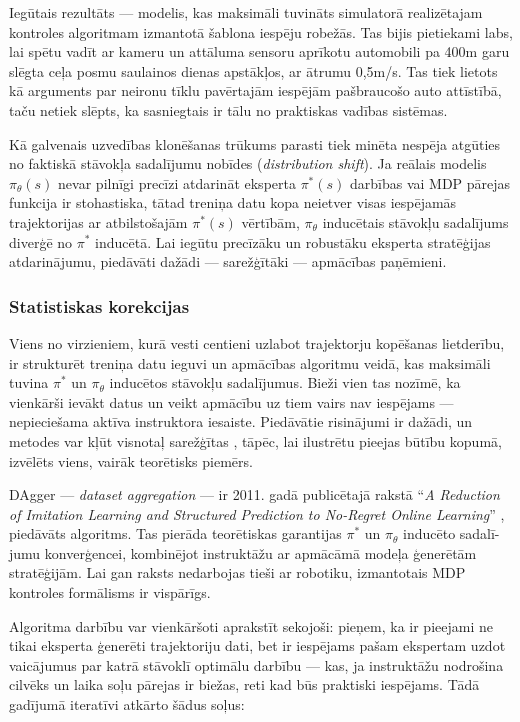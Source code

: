 \documentclass[12pt, a4paper]{article}
\numberwithin{equation}{section} %
\begin{document}
Iegūtais rezultāts --- modelis, kas maksimāli tuvināts simulatorā realizētajam kontroles algoritmam izmantotā šablona iespēju robežās. Tas bijis pietiekami labs, lai spētu vadīt ar kameru un attāluma sensoru aprīkotu automobili pa 400m garu slēgta ceļa posmu saulainos dienas apstākļos, ar ātrumu 0,5m/s. Tas tiek lietots kā arguments par neironu tīklu pavērtajām iespējām pašbraucošo auto attīstībā, taču netiek slēpts, ka sasniegtais ir tālu no praktiskas vadības sistēmas.

Kā galvenais uzvedības klonēšanas trūkums parasti tiek minēta nespēja atgūties no faktiskā stāvokļa sadalījumu nobīdes \cite{attia2018global} (\textit{distribution shift}). Ja reālais modelis $\pi_{\theta}(s)$ nevar pilnīgi precīzi atdarināt eksperta $\pi^*(s)$ darbības vai MDP pārejas funkcija ir stohastiska, tātad treniņa datu kopa neietver visas iespējamās trajektorijas ar atbilstošajām $\pi^*(s)$ vērtībām, $\pi_{\theta}$ inducētais stāvokļu sadalījums diverģē no $\pi^*$ inducētā. Lai iegūtu precīzāku un robustāku eksperta stratēģijas atdarinājumu, piedāvāti dažādi --- sarežģītāki --- apmācības paņēmieni.


\subsubsection{Statistiskas korekcijas}

Viens no virzieniem, kurā vesti centieni uzlabot trajektorju kopēšanas lietderību, ir strukturēt treniņa datu ieguvi un apmācības algoritmu veidā, kas maksimāli tuvina $\pi^*$ un $\pi_{\theta}$ inducētos stāvokļu sadalījumus. Bieži vien tas nozīmē, ka vienkārši ievākt datus un veikt apmācību uz tiem vairs nav iespējams --- nepieciešama aktīva instruktora iesaiste. Piedāvātie risinājumi ir dažādi, un metodes var kļūt visnotaļ sarežģītas \cite{attia2018global}, tāpēc, lai ilustrētu pieejas būtību kopumā, izvēlēts viens, vairāk teorētisks piemērs.

DAgger --- \textit{dataset aggregation} --- ir 2011. gadā publicētajā rakstā ``\textit{A Reduction of Imitation Learning and Structured Prediction
to No-Regret Online Learning}'' \cite{ross2011no}, piedāvāts algoritms. Tas pierāda teorētiskas garantijas $\pi^*$ un $\pi_{\theta}$ inducēto sadalī-jumu konverģencei, kombinējot instruktāžu ar apmācāmā modeļa ģenerētām stratēģijām. Lai gan raksts nedarbojas tieši ar robotiku, izmantotais MDP kontroles formālisms ir vispārīgs.

Algoritma darbību var vienkāršoti aprakstīt sekojoši: pieņem, ka ir pieejami ne tikai eksperta ģenerēti trajektoriju dati, bet ir iespējams pašam ekspertam uzdot vaicājumus par katrā stāvoklī optimālu darbību --- kas, ja instruktāžu nodrošina cilvēks un laika soļu pārejas ir biežas, reti kad būs praktiski iespējams. Tādā gadījumā iteratīvi atkārto šādus soļus:
\end{document}
